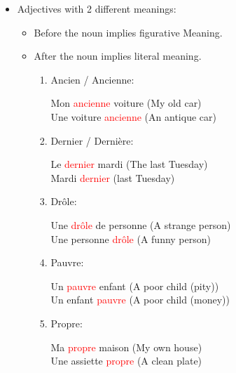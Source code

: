 \documentclass{book}
\begin{document}
\begin{itemize}
\begin{itemize}
            \end{itemize}
        \item Adjectives with 2 different meanings:
            \begin{itemize}
                \item Before the noun implies figurative Meaning.
                \item After the noun implies literal meaning.
                \begin{enumerate}
                    \item Ancien / Ancienne:
                        \begin{center}
                            Mon \textcolor{red}{ancienne} voiture (My old car) \\
                            Une voiture \textcolor{red}{ancienne} (An antique car)
                        \end{center}
                    \item Dernier / Dernière:
                        \begin{center}
                            Le \textcolor{red}{dernier} mardi (The last Tuesday) \\
                            Mardi \textcolor{red}{dernier} (last Tuesday)
                        \end{center}
                    \item Drôle:
                        \begin{center}
                            Une \textcolor{red}{drôle} de personne (A strange person) \\
                            Une personne \textcolor{red}{drôle} (A funny person)
                        \end{center}
                    \item Pauvre:
                        \begin{center}
                            Un \textcolor{red}{pauvre} enfant (A poor child (pity)) \\
                            Un enfant \textcolor{red}{pauvre} (A poor child (money))
                        \end{center}
                    \item Propre:
                        \begin{center}
                            Ma \textcolor{red}{propre} maison (My own house) \\
                            Une assiette \textcolor{red}{propre} (A clean plate)
                        \end{center}
                \end{enumerate}
            \end{itemize}
    \end{itemize}
\end{document}
